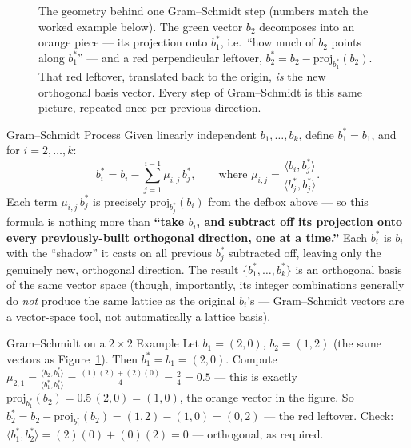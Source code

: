 \begin{figure}[ht]
\centering
{}
\caption{The geometry behind one Gram--Schmidt step (numbers match the worked example below). The green vector $b_2$ decomposes into an orange piece --- its projection onto $b_1^*$, i.e.\ ``how much of $b_2$ points along $b_1^*$'' --- and a red perpendicular leftover, $b_2^* = b_2 - \mathrm{proj}_{b_1^*}(b_2)$. That red leftover, translated back to the origin, \emph{is} the new orthogonal basis vector. Every step of Gram--Schmidt is this same picture, repeated once per previous direction.}
\label{fig:gram-schmidt-projection}
\end{figure}

\begin{defbox}{Gram--Schmidt Process}
Given linearly independent $b_1,\ldots,b_k$, define $b_1^* = b_1$, and for $i = 2,\ldots,k$:
$$
b_i^* = b_i - \sum_{j=1}^{i-1} \mu_{i,j}\, b_j^*, \qquad \text{where } \mu_{i,j} = \frac{\langle b_i, b_j^* \rangle}{\langle b_j^*, b_j^* \rangle}.
$$
Each term $\mu_{i,j}\,b_j^*$ is precisely $\mathrm{proj}_{b_j^*}(b_i)$ from the defbox above --- so this formula is nothing more than \textbf{``take $b_i$, and subtract off its projection onto every previously-built orthogonal direction, one at a time.''} Each $b_i^*$ is $b_i$ with the ``shadow'' it casts on all previous $b_j^*$ subtracted off, leaving only the genuinely new, orthogonal direction. The result $\{b_1^*,\ldots,b_k^*\}$ is an orthogonal basis of the same vector space (though, importantly, its integer combinations generally do \emph{not} produce the same lattice as the original $b_i$'s --- Gram--Schmidt vectors are a vector-space tool, not automatically a lattice basis).
\end{defbox}

\begin{exbox}{Gram--Schmidt on a $2 \times 2$ Example}
Let $b_1 = (2,0)$, $b_2 = (1,2)$ (the same vectors as Figure~\ref{fig:gram-schmidt-projection}). Then $b_1^* = b_1 = (2,0)$. Compute $\mu_{2,1} = \frac{\langle b_2,b_1^*\rangle}{\langle b_1^*,b_1^*\rangle} = \frac{(1)(2)+(2)(0)}{4} = \frac{2}{4} = 0.5$ --- this is exactly $\mathrm{proj}_{b_1^*}(b_2) = 0.5\,(2,0) = (1,0)$, the orange vector in the figure. So $b_2^* = b_2 - \mathrm{proj}_{b_1^*}(b_2) = (1,2) - (1,0) = (0,2)$ --- the red leftover. Check: $\langle b_1^*, b_2^* \rangle = (2)(0)+(0)(2) = 0$ --- orthogonal, as required.
\end{exbox}

